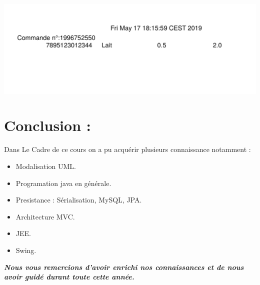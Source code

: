 \documentclass[french,10pt,a4paper]{report}
\begin{document}
\begin{center}
	\includegraphics[scale=0.2]{captures/8_swing.png}
\end{center}


\section{Conclusion :}
Dans Le Cadre de ce cours on a pu acquérir plusieurs connaissance notamment : 
\begin{itemize}
\item Modalisation UML.
\item Programation java en générale.
\item Presistance : Sérialisation, MySQL, JPA.
\item Architecture MVC.
\item JEE.
\item Swing.
\end{itemize}
\textbf{\textit{Nous vous remercions d'avoir enrichi nos connaissances et de nous avoir guidé durant toute cette année.}}
\end{document}
